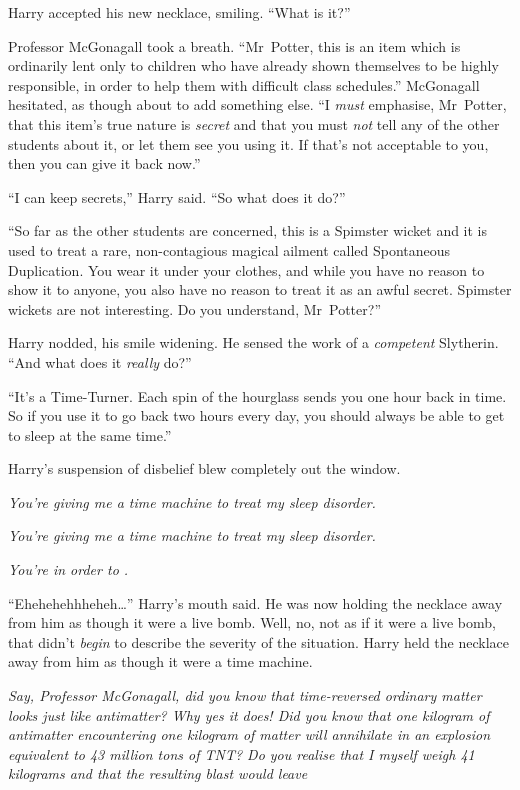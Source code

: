 Harry accepted his new necklace, smiling. “What is it?”

Professor McGonagall took a breath. “Mr~Potter, this is an item which is ordinarily lent only to children who have already shown themselves to be highly responsible, in order to help them with difficult class schedules.” McGonagall hesitated, as though about to add something else. “I \emph{must} emphasise, Mr~Potter, that this item’s true nature is \emph{secret} and that you must \emph{not} tell any of the other students about it, or let them see you using it. If that’s not acceptable to you, then you can give it back now.”

“I can keep secrets,” Harry said. “So what does it do?”

“So far as the other students are concerned, this is a Spimster wicket and it is used to treat a rare, non-contagious magical ailment called Spontaneous Duplication. You wear it under your clothes, and while you have no reason to show it to anyone, you also have no reason to treat it as an awful secret. Spimster wickets are not interesting. Do you understand, Mr~Potter?”

Harry nodded, his smile widening. He sensed the work of a \emph{competent} Slytherin. “And what does it \emph{really} do?”

“It’s a Time-Turner. Each spin of the hourglass sends you one hour back in time. So if you use it to go back two hours every day, you should always be able to get to sleep at the same time.”

Harry’s suspension of disbelief blew completely out the window.

\emph{You’re giving me a time machine to treat my sleep disorder.}

\emph{You’re giving me a \emph{time machine} to treat my \emph{sleep disorder.}}

\emph{You’re  in order to .}

“Ehehehehhheheh…” Harry’s mouth said. He was now holding the necklace away from him as though it were a live bomb. Well, no, not as if it were a live bomb, that didn’t \emph{begin} to describe the severity of the situation. Harry held the necklace away from him as though it were a time machine.

\emph{Say, Professor McGonagall, did you know that time-reversed ordinary matter looks just like antimatter? Why yes it does! Did you know that one kilogram of antimatter encountering one kilogram of matter will annihilate in an explosion equivalent to 43 million tons of TNT? Do you realise that I myself weigh 41 kilograms and that the resulting blast would leave }

